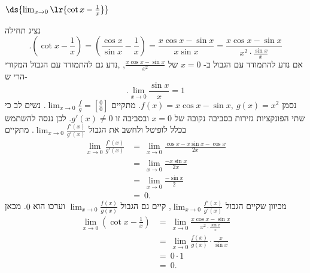 \item $\ds{\lim_{x \to 0} \lr{\cot x - \frac{1}{x}}}$
\begin{solbox}
נציג תחילה
$$.\left(\cot x-\frac{1}{x}\right)
=\left(\frac{\cos x}{\sin x}-\frac{1}{x}\right)=\frac{x\cos x-\sin x}{x\sin x}=\frac{x\cos x-\sin x}{x^2\cdot\frac{\sin x}{x}}$$
אם נדע להתמודד עם הגבול ב-
$x=0$
של
$\frac{x\cos x-\sin x}{x^2}$,
,נדע גם להתמודד עם הגבול המקורי
הרי ש-
$$.\displaystyle\lim_{x\to0}\frac{\sin x}{x}=1$$
נסמן
$f(x)=x\cos x-\sin x,\ g(x)=x^2$.
מתקיים
$\displaystyle\lim_{x\to0}\frac{f}{g}=\left[\frac{0}{0}\right]$.
נשים לב כי שתי הפונקציות גזירות בסביבה נקובה של
$x=0$
ובסביבה זו
$g'(x)\neq0$.
לכן ננסה להשתמש בכלל לופיטל ולחשב את הגבול
$\displaystyle\lim_{x\to0}\frac{f'(x)}{g'(x)}$.
מתקיים
\begin{align*}
\displaystyle\lim_{x\to0}\frac{f'(x)}{g'(x)}
&=\ \lim_{x\to 0}\frac{\cos x-x\sin x-\cos x}{2x}\\
&=\ \lim_{x\to 0}\frac{-x\sin x}{2x}\\
&=\ \lim_{x\to 0}\frac{-\sin x}{2}\\\
&=\ 0.
\end{align*}
מכיוון שקיים הגבול
$\displaystyle\lim_{x\to0}\frac{f'(x)}{g'(x)}$,
קיים גם הגבול
$\displaystyle\lim_{x\to0}\frac{f(x)}{g(x)}$
וערכו הוא
$0$.
מכאן
\begin{align*}
    \lim_{x\to0}\left(\cot x-\frac{1}{x}\right)&=\ \lim_{x\to0}\frac{x\cos x-\sin x}{x^2\cdot\frac{\sin x}{x}}\\
    &=\ \lim_{x\to0}\frac{f(x)}{g(x)}\cdot\frac{x}{\sin x}\\
    &=\ 0\cdot1\\
    &=\ 0.
\end{align*}
\end{solbox}

